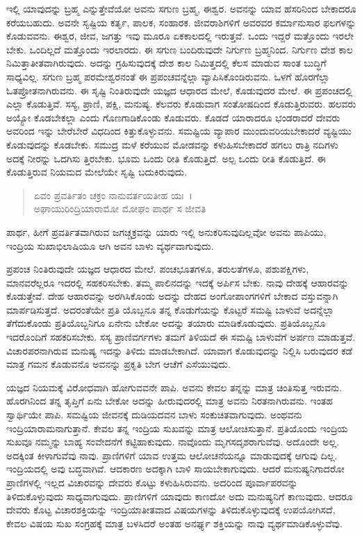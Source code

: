ಇಲ್ಲಿ ಯಾವುದನ್ನು ಬ್ರಹ್ಮ ಎನ್ನುತ್ತೇವೆಯೋ ಅವನು ಸಗುಣ ಬ್ರಹ್ಮ, ಈಶ್ವರ. ಅವನನ್ನು ಯಾವ ಹೆಸರಿನಿಂದ ಬೇಕಾದರೂ ಕರೆಯಬಹುದು. ಅವನೇ ಸೃಷ್ಟಿಯ ಕರ್ತೃ, ಪಾಲಕ, ಸಂಹಾರಕ. ಜೀವರಾಶಿಗಳಿಗೆ ಅವರವರ ಕರ್ಮಾನುಸಾರ ಫಲಗಳನ್ನು ಕೊಡುವವನು. ಈಶ್ವರ, ಜೀವ, ಜಗತ್ತು ಇವು ಮೂರೂ ಏಕಕಾಲದಲ್ಲಿ ಇರುತ್ತವೆ. ಒಂದು ಇದ್ದರೆ ಮತ್ತೊಂದು ಇರಲೇ ಬೇಕು. ಒಂದಿಲ್ಲದೆ ಮತ್ತೊಂದು ಇರಲಾರದು. ಈ ಸಗುಣ ಬಂದಿರುವುದೇ ನಿರ್ಗುಣ ಬ್ರಹ್ಮನಿಂದ. ನಿರ್ಗುಣ ದೇಶ ಕಾಲ ನಿಮಿತ್ತಾತೀತವಾಗಿರುವುದು. ಅದನ್ನು ಗ್ರಹಿಸುವುದಕ್ಕೆ ದೇಶ ಕಾಲ ನಿಮಿತ್ತದಲ್ಲಿ ಕೆಲಸ ಮಾಡುವ ಸಾಂತ ಬುದ್ಧಿಗೆ ಸಾಧ್ಯವಿಲ್ಲ. ಸಗುಣ ಬ್ರಹ್ಮ ಪರಮೇಶ್ವರನಂತೆ ಈ ಪ್ರಪಂಚವನ್ನೆಲ್ಲಾ ವ್ಯಾಪಿಸಿಕೊಂಡಿರುವನು. ಒಳಗೆ ಹೊರಗೆಲ್ಲಾ ಓತಪ್ರೋತನಾಗಿರುವನು. ಈ ಸೃಷ್ಟಿ ನಿಂತಿರುವುದೇ ಯಜ್ಞದ ಆಧಾರದ ಮೇಲೆ, ಕೊಡುವುದರ ಮೇಲೆ. ಈ ಪ್ರಪಂಚದಲ್ಲಿ ಎಲ್ಲಾ ಕೊಡುತ್ತಿವೆ. ಸಸ್ಯ, ಪ್ರಾಣಿ, ಪಕ್ಷಿ, ಮನುಷ್ಯ. ಕೆಲವರು ಕೊಡುವಾಗ ಸಂತೋಷದಿಂದ ಕೊಡುತ್ತಿರುವರು. ಹಲವರು ಅಯ್ಯೋ ಕೊಡಬೇಕಲ್ಲಾ ಎಂದು ಗೊಣಗಾಡಿಕೊಂಡು ಕೊಡುವರು. ಕೊಡದೆ ಯಾರಾದರೂ ಭಂಡರಾದರೆ ದೇವರು ಅವರಿಂದ ಇನ್ನು ಬೇರೆಬೇರೆ ವಿಧದಿಂದ ಕಿತ್ತುಕೊಳ್ಳುವನು. ಸಮಷ್ಟಿಯ ವ್ಯಾಪಾರ ಮುಂದುವರಿಯಬೇಕಾದರೆ ವ್ಯಷ್ಟಿಯು ಕೊಡುವುದನ್ನು ಕೊಡಬೇಕು. ಸಮುದ್ರ ಮಳೆ ಕರೆಯುವ ಮೋಡವನ್ನು ಕಳುಹಿಸಬೇಕಾದರೆ ಹಗಲು ರಾತ್ರಿ ನದಿಗಳು ಅದಕ್ಕೆ ನೀರನ್ನು ಒದಗಿಸು ತ್ತಿರಬೇಕು. ಭೂಮ ಒಂದು ರೀತಿ ಕೊಡುತ್ತಿದೆ. ಅಲ್ಪ ಒಂದು ರೀತಿ ಕೊಡುತ್ತಿದೆ. ಈ ಕೊಡುತ್ತಿರುವ ನಿಯಮದ ಮೇಲೆಯೇ ಸೃಷ್ಟಿ ಬದುಕಿರುವುದು.

\begin{verse}
ಏವಂ ಪ್ರವರ್ತಿತಂ ಚಕ್ರಂ ನಾನುವರ್ತಯತೀಹ ಯಃ~।\\ಅಘಾಯುರಿಂದ್ರಿಯಾರಾಮೋ ಮೋಘಂ ಪಾರ್ಥ ಸ ಜೀವತಿ 
\end{verse}

{\small ಪಾರ್ಥ, ಹೀಗೆ ಪ್ರವರ್ತಿತವಾಗಿರುವ ಜಗಚ್ಚಕ್ರವನ್ನು ಯಾರು ಇಲ್ಲಿ ಅನುಕರಿಸುವುದಿಲ್ಲವೋ ಅವನು ಪಾಪಿಯು, ಇಂದ್ರಿಯ ಸುಖಾಭಿಲಾಷಿಯೂ ಆಗಿ ಅವನ ಬಾಳು ವ್ಯರ್ಥವಾಗುವುದು.}

ಪ್ರಪಂಚ ನಿಂತಿರುವುದೇ ಯಜ್ಞದ ಆಧಾರದ ಮೇಲೆ. ಪಂಚಭೂತಗಳೂ, ತರುಲತೆಗಳೂ, ಪಶುಪಕ್ಷಿಗಳು, ಮಾನವರೆಲ್ಲರೂ ಇದರಲ್ಲಿ ಸಹಕರಿಸಬೇಕು. ತಮ್ಮ ಪಾಲಿನದನ್ನು ಇದಕ್ಕೆ ಅರ್ಪಿಸ ಬೇಕು. ನಾವು ದೇಹಕ್ಕೆ ಆಹಾರವನ್ನು ಕೊಡುತ್ತೇವೆ. ದೇಹ ಆಹಾರವನ್ನು ಅರಗಿಸಿಕೊಂಡು ಅದನ್ನು ದೇಹದ ಅಂಗೋಪಾಂಗಗಳಿಗೆ ಬೇಕಾದ ವಸ್ತುವನ್ನಾಗಿ ಮಾರ್ಪಡಿಸುತ್ತದೆ. ಅದರಂತೆಯೇ ಪ್ರತಿ ಯೊಬ್ಬನೂ ತನ್ನ ಕೊಡುಗೆಯನ್ನು ಕೊಟ್ಟರೆ ಸಮಷ್ಟಿ ಬಾಳುವೆ ಅದನ್ನೆಲ್ಲಾ ತೆಗೆದುಕೊಂಡು ಪ್ರತಿಯೊಬ್ಬನಿಗೂ ಏನೇನು ಬೇಕೋ ಅದನ್ನು ತಯಾರು ಮಾಡಿಕೊಡುವುದು. ಪ್ರತಿಯೊಬ್ಬನೂ ಇದರೊಂದಿಗೆ ಸಹಕರಿಸಬೇಕು. ಸಸ್ಯ ಪ್ರಾಣಿವರ್ಗಗಳು ತಮಗೆ ತಿಳಿಯದೆ ಈ ಸಮಷ್ಟಿ ಬಾಳುವೆಗೆ ಅರ್ಪಣ ಮಾಡುತ್ತವೆ. ವಿಚಾರಪರನಾಗಿರುವ ಮನುಷ್ಯ ಇದನ್ನು ತಿಳಿದು ಮಾಡಬೇಕಾಗಿದೆ. ಯಾವಾಗ ಕೊಡುವುದನ್ನು ನಿಲ್ಲಿಸಿ ಬರುವುದರ ಕಡೆ ಮಾತ್ರ ಗಮನ ಕೊಡುವನೊ ಅವನನ್ನು ಪ್ರಕೃತಿ ಬೇಗ ಆಚೆಗೆ ಎಸೆಯುವುದು.

ಯಜ್ಞದ ನಿಯಮಕ್ಕೆ ವಿರೋಧವಾಗಿ ಹೋಗುವವನೇ ಪಾಪಿ. ಅವನು ಕೇವಲ ತನ್ನನ್ನು ಮಾತ್ರ ಚಿಂತಿಸುತ್ತ ಇರುವನು. ಹೊರಗಿನಿಂದ ತನ್ನ ತೃಪ್ತಿಗೆ ಏನು ಬೇಕೋ ಅದನ್ನು ಹೀರುವುದರಲ್ಲಿ ಮಾತ್ರ ಅವನು ನಿರತನಾಗಿರುವನು. ಇಂತಹ ಸ್ವಾರ್ಥಿಯೇ ಪಾಪಿ. ಸಮಷ್ಟಿಯ ಜೀವನಕ್ಕೆ ದುಡಿಯದವನ ಬಾಳು ಸಂಕುಚಿತವಾಗುವುದು. ಅಂಥವನು ಇಂದ್ರಿಯಾರಾಮನಾಗುತ್ತಾನೆ. ಕೇವಲ ತನ್ನ ಇಂದ್ರಿಯ ಸುಖವನ್ನು ಮಾತ್ರ ಆಲೋಚಿಸುತ್ತಾನೆ. ಪ್ರತಿಯೊಂದು ಇಂದ್ರಿಯ ಸುಖವೂ ನಮ್ಮನ್ನು ಬಾಹ್ಯ ಸಂವೇದನೆಗೆ ಕಟ್ಟಿಹಾಕುವುದು. ನಾವೊಂದು ಮೃಗಸದೃಶರಾಗುವೆವು. ಅದೊಂದೇ ಅಲ್ಲ. ಅದಕ್ಕಿಂತ ಕೀಳಾಗುವೆವು ನಾವು. ಪ್ರಾಣಿಗಳಿಗೆ ಯಾವ ಉತ್ತಮ ಆಲೋಚನೆಯನ್ನೂ ಮಾಡುವುದಕ್ಕೆ ಆಗುವು ದಿಲ್ಲ. ಇಂದ್ರಿಯದಲ್ಲಿ ಅವು ಬದ್ಧವಾಗಿವೆ. ಆದಕಾರಣ ಅದಕ್ಕಾಗಿ ಬಾಳಿ ಸಾಯಬೇಕಾಗುವುದು. ಆದರೆ ಮನುಷ್ಯನಿಗಾದರೋ ಪ್ರಾಣಿಗಳಲ್ಲಿ ಇಲ್ಲದ ವಿಚಾರವನ್ನು ದೇವರು ಕೊಟ್ಟು ಕಳುಹಿಸಿರುವನು. ಅದರಿಂದ ಪೂರ್ವಾಪರವನ್ನು ತಿಳಿದುಕೊಳ್ಳುವುದು ಸಾಧ್ಯವಾಗುವುದು. ಪ್ರಾಣಿಗಳಿಗೆ ಯಾವುದು ಕಾಣದೋ ಅದು ಮನುಷ್ಯನಿಗೆ ಕಾಣುವುದು. ಆದರೂ ದೇವರು ಕೊಟ್ಟ ವಿಚಾರಶಕ್ತಿಯನ್ನು ಇಂದ್ರಿಯಾತೀತವಾದ ವಿಷಯಗಳನ್ನು ತಿಳಿದುಕೊಳ್ಳುವುದಕ್ಕೆ ಉಪಯೋಗಿಸದೆ, ಕೇವಲ ವಿಷಯ ಸುಖ ಸಂಗ್ರಹಕ್ಕೆ ಮಾತ್ರ ಬಳಸಿದರೆ ಅಂತಹ ಅನರ್ಘ್ಯ ಶಕ್ತಿಯನ್ನು ನಾವು ವ್ಯರ್ಥಮಾಡಿಕೊಳ್ಳುವೆವು.

